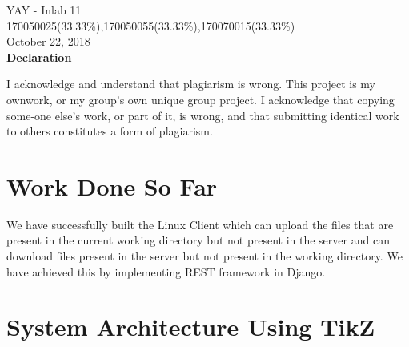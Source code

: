 \documentclass{article}
\begin{document}
\begin{center}
    \LARGE{YAY - Inlab 11}\\
    \vspace{20pt}
    \large{170050025(33.33\%),170050055(33.33\%),170070015(33.33\%)}\\
    \vspace{10pt}
    \large{October 22, 2018}\\
    \vspace{30pt}
    \textbf{Declaration}\\
    \end{center}
    
    I acknowledge and understand that plagiarism is wrong. This project is my ownwork, or my group’s own unique group project. I acknowledge that copying some-one else’s work, or part of it, is wrong, and that submitting identical work to others constitutes a form of plagiarism.
    \section{Work Done So Far}
    We have successfully built the Linux Client which can upload the files that are present in the current working directory but not present in the server and can download files present in the server but not present in the working directory.
    {}We have achieved this by implementing REST framework in Django. {} 
    
    
    \section{System Architecture Using TikZ}
    \begin{center}
    \end{center}
\end{document}
